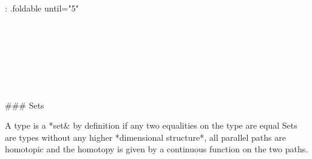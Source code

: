 {: .foldable until="5"}
\begin{code}%
\>[0][@{}l@{\AgdaIndent{1}}]%
\>[2]\<%
\\
%
\>[2]\<%
\\
\>[2][@{}l@{\AgdaIndent{0}}]%
\>[4]\AgdaSymbol{:}\AgdaSpace{}%
\AgdaSpace{}%
\AgdaSymbol{\{}\AgdaSymbol{\}}\AgdaSpace{}%
\AgdaSymbol{(}\AgdaSpace{}%
\AgdaSymbol{:}\AgdaSpace{}%
\AgdaSpace{}%
\AgdaSymbol{)}\AgdaSpace{}%
\AgdaSpace{}%
\AgdaSpace{}%
\<%
\\
%
\>[2]\AgdaSpace{}%
\AgdaSpace{}%
\AgdaSymbol{=}\AgdaSpace{}%
\AgdaSymbol{((}\AgdaSpace{}%
\AgdaSpace{}%
\AgdaSymbol{:}\AgdaSpace{}%
\AgdaSymbol{)}\AgdaSpace{}%
\AgdaSpace{}%
\AgdaSpace{}%
\AgdaOperator{\AgdaDatatype{==}}\AgdaSpace{}%
\AgdaSymbol{)}\<%
\end{code}

\begin{code}%
%
\>[2]\<%
\\
%
\>[2]\AgdaSpace{}%
\AgdaSymbol{:}\AgdaSpace{}%
\AgdaSpace{}%
\AgdaSymbol{\{}\AgdaSymbol{\}}\AgdaSpace{}%
\AgdaSpace{}%
\AgdaSpace{}%
\AgdaSymbol{(}\AgdaSpace{}%
\AgdaSymbol{)}\<%
\\
%
\>[2]\AgdaSpace{}%
\AgdaSymbol{\{}\AgdaSymbol{\}}\AgdaSpace{}%
\AgdaSymbol{=}\AgdaSpace{}%
\AgdaSpace{}%
\AgdaSymbol{(}\AgdaSpace{}%
\AgdaSymbol{)}\AgdaSpace{}%
\<%
\end{code}

\begin{code}%
\>[0]\AgdaSpace{}%
\AgdaSpace{}%
\<%
\end{code}

### Sets

A type is a *set& by definition if any two equalities on the type are equal Sets
are types without any higher *dimensional structure*,  all parallel paths are
homotopic and the homotopy is given by a continuous function on the two paths.


